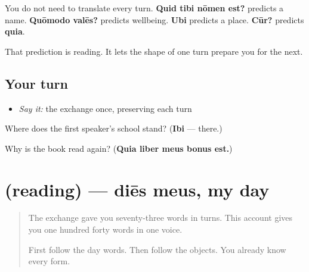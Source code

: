 \begin{grammarlens}[title={Grammar Lens: a dialogue is a chain of answers}]
You do not need to translate every turn. \textbf{Quid tibi nōmen est?} predicts a name. \textbf{Quōmodo valēs?} predicts wellbeing. \textbf{Ubi} predicts a place. \textbf{Cūr?} predicts \textbf{quia}.

That prediction is reading. It lets the shape of one turn prepare you for the next.
\end{grammarlens}

\subsection*{Your turn}
\begin{itemize}
\raggedright
  \item \emph{Say it:} the exchange once, preserving each turn
\end{itemize}

\begin{tcolorbox}[breakable,colback=teal!4,colframe=teal!35!black,title={Before you move on}]
Where does the first speaker's school stand? (\textbf{Ibi} — there.)

Why is the book read again? (\textbf{Quia liber meus bonus est.})
\end{tcolorbox}
\section[(reading)]{(reading) — diēs meus, my day}

\label{lesson:LA-C59-dies-meus}



\begin{quote}
The exchange gave you seventy-three words in turns. This account gives you one hundred forty words in one voice.

First follow the day words. Then follow the objects. You already know every form.
\end{quote}

